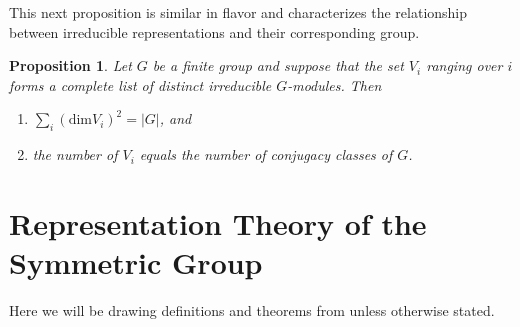 \documentclass[12pt,twoside]{reedthesis}
\theoremstyle{plain}   %
\newtheorem{prop}{Proposition}[section]
\theoremstyle{definition}
\theoremstyle{remark}
\numberwithin{equation}{section}
\def\dim{\mathrm{dim}}
\begin{document}
  This next proposition is similar in flavor and characterizes the relationship between irreducible representations
  and their corresponding group.

  \begin{prop} \label{charprop}
    Let $G$ be a finite group and suppose that the set $V_i$ ranging over $i$ forms a complete list of
    distinct irreducible $G$-modules. Then
    \begin{enumerate}
    \item $\sum_i (\dim V_i)^2 = |G|$, and
    \item the number of $V_i$ equals the number of conjugacy classes of $G$.
    \end{enumerate}
  \end{prop}   
  

  \section{Representation Theory of the Symmetric Group}
  Here we will be drawing definitions and theorems from \cite[Chapter 7]{fulton} unless otherwise stated.
\end{document}

